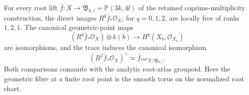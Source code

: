 \begin{proposition}\hypertarget{tag-033I}{}\label{push:src:E.3.1}

For every root lift $\bar f:X\to\mathfrak B_{k,l}=\mathbb P(3k,4l)$
of the retained coprime-multiplicity construction, the direct images
$R^q\bar f_*\mathcal O_X$, for $q=0,1,2$, are locally free of
ranks $1,2,1$. The canonical geometric-point maps
\[
 (R^q\bar f_*\mathcal O_X)\otimes k(b)
 \longrightarrow H^q(X_b,\mathcal O_{X_b})
\]
are isomorphisms, and the trace induces the canonical isomorphism
\[
 (R^2\bar f_*\mathcal O_X)^\vee
 \simeq\bar f_*\omega_{X/\mathfrak B_{k,l}}.
\]
Both comparisons commute with the analytic root-atlas groupoid.
Here the geometric fibre at a finite root point is the smooth torus
on the normalized root chart.
\end{proposition}

